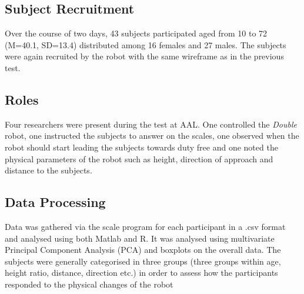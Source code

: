\subsection{Subject Recruitment}
Over the course of two days, 43 subjects participated aged from 10 to 72 (M=40.1, SD=13.4) distributed among 16 females and 27 males. The subjects were again recruited by the robot with the same wireframe as in the previous test.

\subsection{Roles}
Four researchers were present during the test at AAL. One controlled the \textit{Double} robot, one instructed the subjects to answer on the scales, one observed when the robot should start leading the subjects towards duty free and one noted the physical parameters of the robot such as height, direction of approach and distance to the subjects.

\subsection{{\color{red}Data Processing}}
Data was gathered via the scale program for each participant in a .csv format and analysed using both Matlab and R. It was analysed using multivariate Principal Component Analysis (PCA) and boxplots on the overall data. The subjects were generally categorised in three groups (three groups within age, height ratio, distance, direction etc.) in order to assess how the participants responded to the physical changes of the robot 